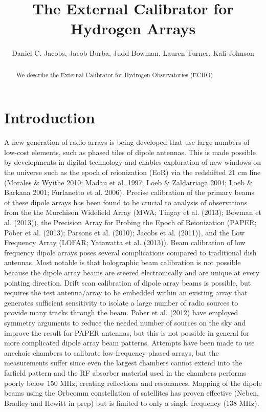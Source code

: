 \documentclass[preprint2]{aastex}
\begin{document}
\title{The External Calibrator for Hydrogen Arrays}
\author{
Daniel C. Jacobs,
Jacob Burba,
Judd Bowman,
Lauren Turner,
Kali Johnson}

\setcounter{footnote}{1}


\begin{abstract}
We describe the External Calibrator for Hydrogen Observatories (ECHO)
\end{abstract}



\section{Introduction}\label{sec:intro}

A new generation of radio arrays is being developed that use large numbers of low-cost elements, such as phased tiles of dipole antennas. This is made possible by developments in digital technology and enables exploration of new windows on the universe such as the epoch of reionization (EoR) via the redshifted 21 cm line (Morales \& Wyithe 2010; Madau et al. 1997; Loeb \& Zaldarriaga 2004; Loeb \& Barkana 2001; Furlanetto et al. 2006). Precise calibration of the primary beams of these dipole arrays has been found to be crucial to analysis of observations from the the Murchison Widefield Array (MWA; Tingay et al. (2013); Bowman et al. (2013)), the Precision Array for Probing the Epoch of Reionization (PAPER; Pober et al. (2013); Parsons et al. (2010); Jacobs et al. (2011)), and the Low Frequency Array (LOFAR; Yatawatta et al. (2013)). Beam calibration of low frequency dipole arrays poses several complications compared to traditional dish antennas. Most notable is that holographic beam calibration is not possible because the dipole array beams are steered electronically and are unique at every pointing direction. Drift scan calibration of dipole array beams is possible, but requires the test antenna/array to be embedded within an existing array that generates sufficient sensitivity to isolate a large number of radio sources to provide many tracks through the beam. Pober et al. (2012) have employed symmetry arguments to reduce the needed number of sources on the sky and improve the result for PAPER antennas, but this is not possible in general for more complicated dipole array beam patterns. Attempts have been made to use anechoic chambers to calibrate low-frequency phased arrays, but the measurements suffer since even the largest chambers cannot extend into the farfield pattern and the RF absorber material used in the chambers performs poorly below 150 MHz, creating reflections and resonances. Mapping of the dipole beams using the Orbcomm constellation of satellites has proven effective (Neben, Bradley and Hewitt in prep) but is limited to only a single frequency (138 MHz).
\end{document}

